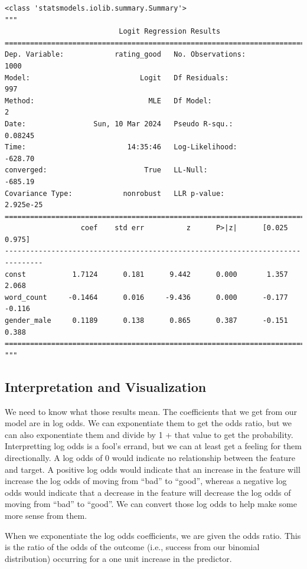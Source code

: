 \documentclass[
  letterpaper,
]{krantz}
\begin{document}
\begin{verbatim}
<class 'statsmodels.iolib.summary.Summary'>
"""
                           Logit Regression Results                           
==============================================================================
Dep. Variable:            rating_good   No. Observations:                 1000
Model:                          Logit   Df Residuals:                      997
Method:                           MLE   Df Model:                            2
Date:                Sun, 10 Mar 2024   Pseudo R-squ.:                 0.08245
Time:                        14:35:46   Log-Likelihood:                -628.70
converged:                       True   LL-Null:                       -685.19
Covariance Type:            nonrobust   LLR p-value:                 2.925e-25
===============================================================================
                  coef    std err          z      P>|z|      [0.025      0.975]
-------------------------------------------------------------------------------
const           1.7124      0.181      9.442      0.000       1.357       2.068
word_count     -0.1464      0.016     -9.436      0.000      -0.177      -0.116
gender_male     0.1189      0.138      0.865      0.387      -0.151       0.388
===============================================================================
"""
\end{verbatim}

\subsection{Interpretation and
Visualization}\label{sec-glm-binomial-interpret}

We need to know what those results mean. The coefficients that we get
from our model are in log odds. We can exponentiate them to get the odds
ratio, but we can also exponentiate them and divide by 1 + that value to
get the probability. Interpretting log odds is a fool's errand, but we
can at least get a feeling for them directionally. A log odds of 0 would
indicate no relationship between the feature and target. A positive log
odds would indicate that an increase in the feature will increase the
log odds of moving from ``bad'' to ``good'', whereas a negative log odds
would indicate that a decrease in the feature will decrease the log odds
of moving from ``bad'' to ``good''. We can convert those log odds to
help make some more sense from them.

When we exponentiate the log odds coefficients, we are given the odds
ratio. This is the ratio of the odds of the outcome (i.e., success from
our binomial distribution) occurring for a one unit increase in the
predictor.
\end{document}
